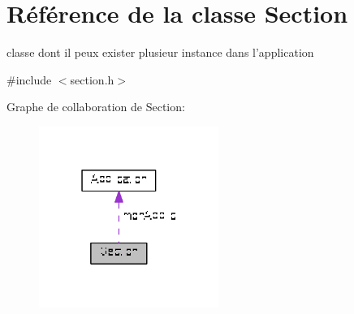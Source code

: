 \hypertarget{class_section}{\section{Référence de la classe Section}
\label{class_section}
}


classe dont il peux exister plusieur instance dans l'application  




{\ttfamily \#include $<$section.\+h$>$}



Graphe de collaboration de Section\+:\nopagebreak
\begin{figure}[H]
\begin{center}
\leavevmode
\includegraphics[width=166pt]{class_section__coll__graph}
\end{center}
\end{figure}
